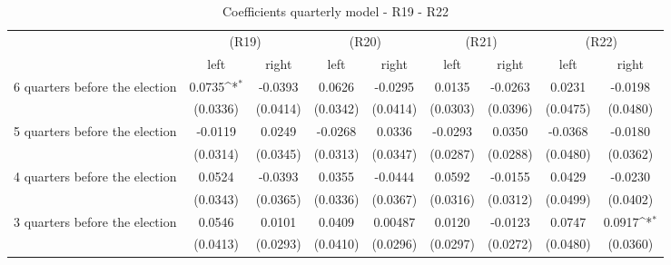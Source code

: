\begin{table}[!ht]\centering \scriptsize
\def\sym#1{\ifmmode^{#1}\else\(^{#1}\)\fi}
\caption{Coefficients quarterly model - R19 - R22}
\begin{tabular}{l*{8}{c}}
\hline\hline
                    &\multicolumn{2}{c}{(R19)}&\multicolumn{2}{c}{(R20)}&\multicolumn{2}{c}{(R21)}&\multicolumn{2}{c}{(R22)}\\
&\multicolumn{1}{c}{left}&\multicolumn{1}{c}{right}&\multicolumn{1}{c}{left}&\multicolumn{1}{c}{right}&\multicolumn{1}{c}{left}&\multicolumn{1}{c}{right} &\multicolumn{1}{c}{left}&\multicolumn{1}{c}{right}\\
\hline
 6 quarters before the election&      0.0735\sym{*}  &     -0.0393         &      0.0626         &     -0.0295         &      0.0135         &     -0.0263         &      0.0231         &     -0.0198         \\
                    &    (0.0336)         &    (0.0414)         &    (0.0342)         &    (0.0414)         &    (0.0303)         &    (0.0396)         &    (0.0475)         &    (0.0480)         \\
[0,12em]
 5 quarters before the election&     -0.0119         &      0.0249         &     -0.0268         &      0.0336         &     -0.0293         &      0.0350         &     -0.0368         &     -0.0180         \\
                    &    (0.0314)         &    (0.0345)         &    (0.0313)         &    (0.0347)         &    (0.0287)         &    (0.0288)         &    (0.0480)         &    (0.0362)         \\
[0,12em]
 4 quarters before the election&      0.0524         &     -0.0393         &      0.0355         &     -0.0444         &      0.0592         &     -0.0155         &      0.0429         &     -0.0230         \\
                    &    (0.0343)         &    (0.0365)         &    (0.0336)         &    (0.0367)         &    (0.0316)         &    (0.0312)         &    (0.0499)         &    (0.0402)         \\
[0,12em]
 3 quarters before the election&      0.0546         &      0.0101         &      0.0409         &     0.00487         &      0.0120         &     -0.0123         &      0.0747         &      0.0917\sym{*}  \\
                    &    (0.0413)         &    (0.0293)         &    (0.0410)         &    (0.0296)         &    (0.0297)         &    (0.0272)         &    (0.0480)         &    (0.0360)         \\

\end{tabular}
\end{table}
